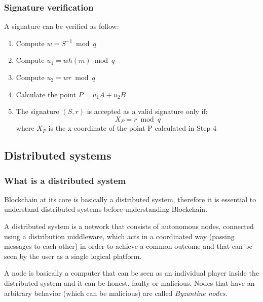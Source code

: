 \subsubsection{Signature verification}
A signature can be verified as follow:
\begin{enumerate}
  \item Compute ${w=S^{-1}\bmod q}$
  \item Compute ${u_1=w  h(m)\bmod q}$
  \item Compute ${u_2=w  r \bmod q}$
  \item Calculate the point ${P=u_1  A + u_2  B}$
  \item The signature ${(S,r)}$ is accepted as a valid signature only if:
   \[{X_P=r \bmod q}\]
   where $X_P$ is the x-coordinate of the point P calculated in Step 4
\end{enumerate}











\subsection{Distributed systems}
\subsubsection{What is a distributed system}
Blockchain at its core is basically a distributed system, therefore it is essential
to understand distributed systems before understanding Blockchain.

A distributed system is a network that consists of autonomous nodes, connected
using a distribution middleware, which acts in a coordinated way (passing
messages to each other) in order to achieve a common outcome and that can be
seen by the user as a single logical platform.

A node is basically a computer that can be seen as an individual player inside
the distributed system and it can be honest, faulty or malicious. Nodes that
have an arbitrary behavior (which can be malicious) are called \emph{Byzantine nodes}.

